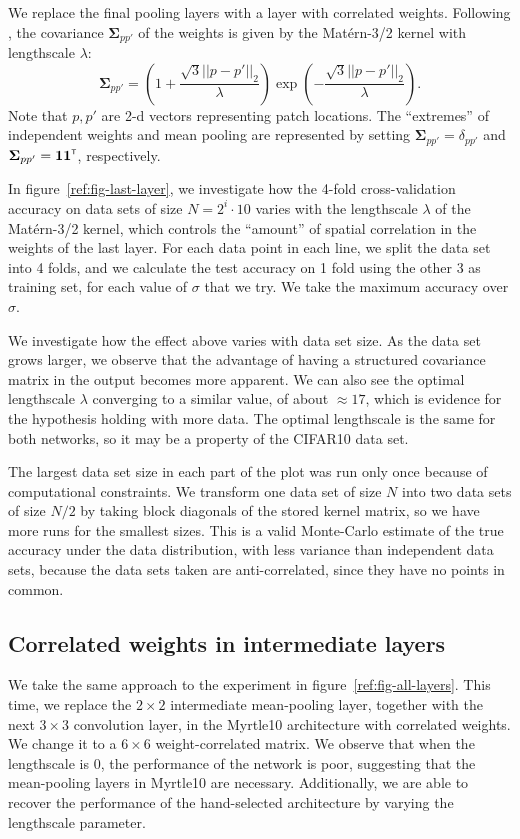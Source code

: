 \documentclass[tablecaption=bottom,wcp,nonatbib]{jmlr} %
\newcommand{\vSigma}{\boldsymbol{\Sigma}}
\newcommand{\tp}{{\mathrm{\textsf{\tiny T}}}}
\newcommand{\bracket}[3]{{\left#1 #3 \right#2}}
\newcommand{\bra}{\bracket{(}{)}}
\begin{document}
We replace the final pooling layers with a layer with correlated weights. Following \citet{dutordoir2020}, the covariance $\vSigma_{pp'}$ of the weights is given by the Matérn-3/2 kernel with lengthscale $\lambda$:
\begin{equation}
    \vSigma_{pp'} = \bra{1 + \frac{\sqrt{3}||p - p'||_2}{\lambda}} \exp\bra{-\frac{\sqrt{3}||p - p'||_2}{\lambda}}.
\end{equation}
Note that $p,p'$ are 2-d vectors representing patch locations. The ``extremes'' of independent weights and mean pooling are represented by setting $\vSigma_{pp'} = \delta_{pp'}$ and $\vSigma_{pp'} = {\boldsymbol 1\boldsymbol 1}^\tp$, respectively.

In figure~\ref{ref:fig-last-layer}, we investigate how the 4-fold cross-validation accuracy on data sets of size $N=2^i \cdot 10$ varies with the lengthscale $\lambda$ of the Matérn-3/2 kernel, which controls the ``amount'' of spatial correlation in the weights of the last layer. For each data point in each line, we split the data set into 4 folds, and we calculate the test accuracy on 1 fold using the other 3 as training set, for each value of $\sigma$ that we try. We take the maximum accuracy over $\sigma$.

We investigate how the effect above varies with data set size. As the data set grows larger, we observe that the advantage of having a structured covariance matrix in the output becomes more apparent. We can also see the optimal lengthscale $\lambda$  converging to a similar value, of about $\approx 17$, which is evidence for the hypothesis holding with more data. The optimal lengthscale is the same for both networks, so it may be a property of the CIFAR10 data set.

The largest data set size in each part of the plot was run only once because of computational constraints. We transform one data set of size $N$ into two data sets of size $N/2$ by taking block diagonals of the stored kernel matrix, so we have more runs for the smallest sizes. This is a valid Monte-Carlo estimate of the true accuracy under the data distribution, with less variance than independent data sets, because the data sets taken are anti-correlated, since they have no points in common.

\subsection{Correlated weights in intermediate layers}
We take the same approach to the experiment in figure~\ref{ref:fig-all-layers}. This time, we replace the $2\times 2$ intermediate mean-pooling layer, together with the next $3\times 3$ convolution layer, in the Myrtle10 architecture with correlated weights. We change it to a $6 \times 6$ weight-correlated matrix. We observe that when the lengthscale is 0, the performance of the network is poor, suggesting that the mean-pooling layers in Myrtle10 are necessary. Additionally, we are able to recover the performance of the hand-selected architecture by varying the lengthscale parameter.
\end{document}
